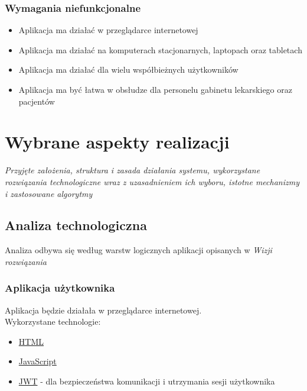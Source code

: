 \documentclass[polish,12pt]{aghthesis}
\begin{document}
\subsubsection{Wymagania niefunkcjonalne}
\begin{itemize}
    \item Aplikacja ma działać w przeglądarce internetowej
    \item Aplikacja ma działać na komputerach stacjonarnych, laptopach oraz tabletach
    \item Aplikacja ma działać dla wielu współbieżnych użytkowników
    \item Aplikacja ma być łatwa w obsłudze dla personelu gabinetu lekarskiego oraz pacjentów
\end{itemize}


\section{Wybrane aspekty realizacji}
\label{sec:wybrane-aspekty-realizacji}

\emph{Przyjęte założenia, struktura i zasada działania systemu,
  wykorzystane rozwiązania technologiczne wraz z uzasadnieniem
  ich wyboru, istotne mechanizmy i zastosowane algorytmy}

\subsection{Analiza technologiczna}
\label{subsec:analizaTechnologiczna}
Analiza odbywa się według warstw logicznych aplikacji opisanych w \emph{Wizji rozwiązania}

\subsubsection{Aplikacja użytkownika}
Aplikacja będzie działała w przeglądarce internetowej. \\
Wykorzystane technologie:
\begin{itemize}
  \item \href{https://pl.wikipedia.org/wiki/HTML}{HTML}
  \item \href{https://pl.wikipedia.org/wiki/JavaScript}{JavaScript}
  \item \href{https://jwt.io/}{JWT} - dla bezpieczeństwa komunikacji i utrzymania sesji użytkownika
\end{itemize}
\end{document}
